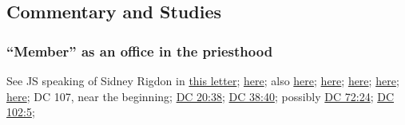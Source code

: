 
	
	
	
	
\subsection{Commentary and Studies} %
	\label{MEMBER-COMMENTARY}

	
		
	\subsubsection{``Member'' as an office in the priesthood}
		\label{MEMBER-office}
		
		See JS speaking of Sidney Rigdon in \hyperref[EMS-1832-JS-31-JUL-1832]{this letter}; \hyperref[EMS-1832-JS-27-NOV-1832]{here}; also \hyperref[EMS-1833-JS-2-JUL-1833-JS]{here}; \hyperref[EMS-1834-JS-17-FEB-1834]{here}; \hyperref[EMS-1834-JS-18-19-FEB-1834]{here}; \hyperref[EMS-1834-JS-19-FEB-1834]{here}; \hyperref[EMS-1834-JS-7-JUL-1834]{here}; DC 107, near the beginning; \hyperref[DC20-38]{DC 20:38}; \hyperref[DC38-40]{DC 38:40}; possibly \hyperref[DC72-24]{DC 72:24}; \hyperref[DC102-5]{DC 102:5}; 
		
